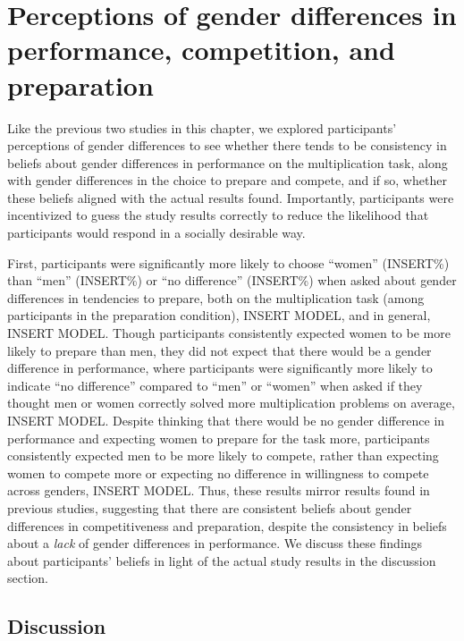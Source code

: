 \documentclass[a4paper, nobind]{templates/ociamthesis}
\begin{document}
\hypertarget{perceptions-of-gender-differences-in-performance-competition-and-preparation}{%
\section{Perceptions of gender differences in performance, competition, and preparation}\label{perceptions-of-gender-differences-in-performance-competition-and-preparation}}

Like the previous two studies in this chapter, we explored participants' perceptions of gender differences to see whether there tends to be consistency in beliefs about gender differences in performance on the multiplication task, along with gender differences in the choice to prepare and compete, and if so, whether these beliefs aligned with the actual results found. Importantly, participants were incentivized to guess the study results correctly to reduce the likelihood that participants would respond in a socially desirable way.

First, participants were significantly more likely to choose ``women'' (INSERT\%) than ``men'' (INSERT\%) or ``no difference'' (INSERT\%) when asked about gender differences in tendencies to prepare, both on the multiplication task (among participants in the preparation condition), INSERT MODEL, and in general, INSERT MODEL. Though participants consistently expected women to be more likely to prepare than men, they did not expect that there would be a gender difference in performance, where participants were significantly more likely to indicate ``no difference'' compared to ``men'' or ``women'' when asked if they thought men or women correctly solved more multiplication problems on average, INSERT MODEL. Despite thinking that there would be no gender difference in performance and expecting women to prepare for the task more, participants consistently expected men to be more likely to compete, rather than expecting women to compete more or expecting no difference in willingness to compete across genders, INSERT MODEL. Thus, these results mirror results found in previous studies, suggesting that there are consistent beliefs about gender differences in competitiveness and preparation, despite the consistency in beliefs about a \emph{lack} of gender differences in performance. We discuss these findings about participants' beliefs in light of the actual study results in the discussion section.

\hypertarget{discussion-2}{%
\subsection{Discussion}\label{discussion-2}}
\end{document}
